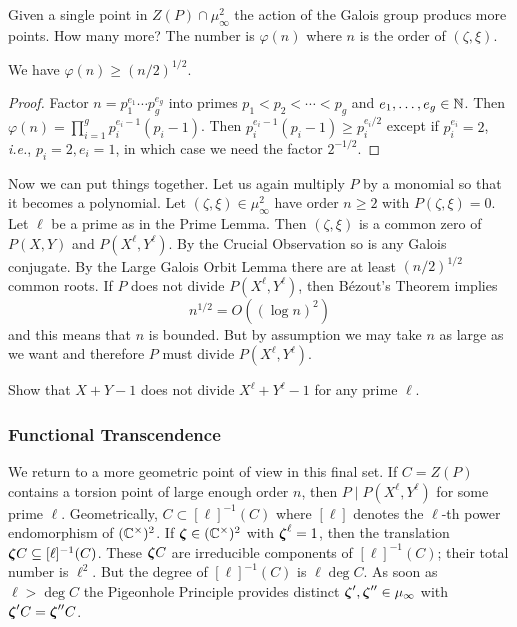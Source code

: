 Given a single point in $Z(P)\cap\mu_\infty^2$ the action of the
Galois group producs more points. How many more? The number is
$\varphi(n)$ where $n$ is the order of $(\zeta,\xi)$. 

\begin{lemma}
  We have $\varphi(n) \ge (n/2)^{1/2}$. 
\end{lemma}
\begin{proof}
  Factor $n=p_1^{e_1}\cdots p_g^{e_g}$ into primes $p_1<p_2<\cdots <
  p_g$ and $e_1,\ldots,e_g\in{\mathbb{N}}$. Then $\varphi(n) = \prod_{i=1}^g
  p_i^{e_i-1}(p_i-1)$. Then $p_i^{e_i-1}(p_i-1)\ge p_i^{e_i/2}$ except
  if $p_i^{e_i}=2$, \textit{i.e.}, $p_i=2,e_i=1$, in which case we
  need the factor $2^{-1/2}$. 
\end{proof}

Now we can put things together. Let us again multiply $P$ by a
monomial so that it becomes a polynomial.
Let $(\zeta,\xi)\in \mu_\infty^2$ have order $n\ge 2$ with
$P(\zeta,\xi)=0$. Let $\ell$ be a prime as in the Prime Lemma.
Then $(\zeta,\xi)$ is a common zero of $P(X,Y)$ and
$P(X^{\ell},Y^{\ell})$. By the Crucial Observation so is any Galois
conjugate. By the Large Galois Orbit Lemma there are at least
$(n/2)^{1/2}$ common roots. If $P$ does not divide $P(X^\ell,Y^\ell)$,
then B\'ezout's Theorem implies
\begin{equation*}
  n^{1/2} = O((\log n)^2)
\end{equation*}
and this means that $n$ is bounded. But by assumption we may take $n$
as large as we want and therefore $P$ must divide $P(X^\ell,Y^\ell)$.

\begin{exercise}
  Show that $X+Y-1$ does not divide  $X^\ell + Y^\ell-1$ for any prime
  $\ell$. 
\end{exercise}

\subsubsection{Functional Transcendence}

We return to a more geometric point of view in this final set.
If $C=Z(P)$ contains a torsion point of large enough order $n$, then
$P \mid P(X^\ell,Y^\ell)$ for some prime $\ell$.
Geometrically, $C \subset [\ell]^{-1}(C)$ where $[\ell]$ denotes the $\ell$-th
power endomorphism of $({\mathbb{C}}^\times)^2$.
If ${\boldsymbol{\zeta}}\in ({\mathbb{C}}^\times)^2$ with ${\boldsymbol{\zeta}}^\ell=1$, then the
translation ${\boldsymbol{\zeta}} C\subseteq [\ell]^{-1}(C)$. These ${\boldsymbol{\zeta}} C$ are
irreducible components of $[\ell]^{-1}(C)$; their total number is
$\ell^2$. But the degree of $[\ell]^{-1}(C)$ is $\ell \deg C$. As soon
as $\ell > \deg C$ the Pigeonhole Principle provides distinct
${\boldsymbol{\zeta}}',{\boldsymbol{\zeta}}''\in \mu_\infty$ with ${\boldsymbol{\zeta}}' C = {\boldsymbol{\zeta}}''C$.

